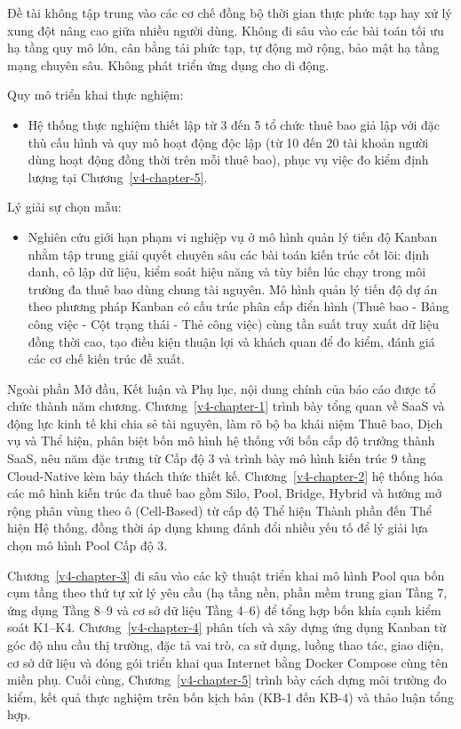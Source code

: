 Đề tài không tập trung vào các cơ chế đồng bộ thời gian thực phức tạp hay xử lý xung đột nâng cao giữa nhiều người dùng. Không đi sâu vào các bài toán tối ưu hạ tầng quy mô lớn, cân bằng tải phức tạp, tự động mở rộng, bảo mật hạ tầng mạng chuyên sâu. Không phát triển ứng dụng cho di động.

Quy mô triển khai thực nghiệm:

\begin{itemize}
\tightlist
\item
  Hệ thống thực nghiệm thiết lập từ 3 đến 5 tổ chức thuê bao giả lập với đặc thù cấu hình và quy mô hoạt động độc lập (từ 10 đến 20 tài khoản người dùng hoạt động đồng thời trên mỗi thuê bao), phục vụ việc đo kiểm định lượng tại Chương~\ref{v4-chapter-5}.
\end{itemize}

Lý giải sự chọn mẫu:

\begin{itemize}
\tightlist
\item
  Nghiên cứu giới hạn phạm vi nghiệp vụ ở mô hình quản lý tiến độ Kanban nhằm tập trung giải quyết chuyên sâu các bài toán kiến trúc cốt lõi: định danh, cô lập dữ liệu, kiểm soát hiệu năng và tùy biến lúc chạy trong môi trường đa thuê bao dùng chung tài nguyên. Mô hình quản lý tiến độ dự án theo phương pháp Kanban có cấu trúc phân cấp điển hình (Thuê bao - Bảng công việc - Cột trạng thái - Thẻ công việc) cùng tần suất truy xuất dữ liệu đồng thời cao, tạo điều kiện thuận lợi và khách quan để đo kiểm, đánh giá các cơ chế kiến trúc đề xuất.
\end{itemize}

\label{v4-intro-7}

Ngoài phần Mở đầu, Kết luận và Phụ lục, nội dung chính của báo cáo được tổ chức thành năm chương. Chương~\ref{v4-chapter-1} trình bày tổng quan về SaaS và động lực kinh tế khi chia sẻ tài nguyên, làm rõ bộ ba khái niệm Thuê bao, Dịch vụ và Thể hiện, phân biệt bốn mô hình hệ thống với bốn cấp độ trưởng thành SaaS, nêu năm đặc trưng từ Cấp độ 3 và trình bày mô hình kiến trúc 9 tầng Cloud-Native kèm bảy thách thức thiết kế. Chương~\ref{v4-chapter-2} hệ thống hóa các mô hình kiến trúc đa thuê bao gồm Silo, Pool, Bridge, Hybrid và hướng mở rộng phân vùng theo ô (Cell-Based) từ cấp độ Thể hiện Thành phần đến Thể hiện Hệ thống, đồng thời áp dụng khung đánh đổi nhiều yếu tố để lý giải lựa chọn mô hình Pool Cấp độ 3.

Chương~\ref{v4-chapter-3} đi sâu vào các kỹ thuật triển khai mô hình Pool qua bốn cụm tầng theo thứ tự xử lý yêu cầu (hạ tầng nền, phần mềm trung gian Tầng 7, ứng dụng Tầng 8--9 và cơ sở dữ liệu Tầng 4--6) để tổng hợp bốn khía cạnh kiểm soát K1--K4. Chương~\ref{v4-chapter-4} phân tích và xây dựng ứng dụng Kanban từ góc độ nhu cầu thị trường, đặc tả vai trò, ca sử dụng, luồng thao tác, giao diện, cơ sở dữ liệu và đóng gói triển khai qua Internet bằng Docker Compose cùng tên miền phụ. Cuối cùng, Chương~\ref{v4-chapter-5} trình bày cách dựng môi trường đo kiểm, kết quả thực nghiệm trên bốn kịch bản (KB-1 đến KB-4) và thảo luận tổng hợp.

